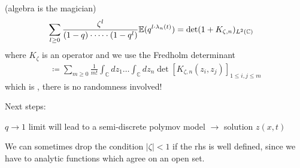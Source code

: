  (algebra is the magician)
\begin{align*}
    \sum_{l\geq 0}\frac{\zeta^l}{(1-q)\cdot\dots\cdot (1-q^l)}\mathbb{E}(q^{l\cdot \lambda_n(t)})&=\det(1+K_{\zeta,n})_{L^2(\mathbb{C})}
\end{align*}
where $K_\zeta$ is an operator and we use the Fredholm determinant
\begin{align*}
    \coloneqq \sum_{m\geq 0}\frac{1}{m!}\int_{\mathbb{C}}dz_1\dots\int_{\mathbb{C}}d z_n\det[K_{\zeta,n}(z_i,z_j)]_{1\leq i,j\leq m}
\end{align*}
which is , there is no randomness involved!

Next steps:

$q\to 1$ limit will lead to a semi-discrete polymov model $\to$ solution $z(x,t)$


\begin{aremark}
    We can sometimes drop the condition $|\zeta|<1$ if the rhs is well defined, since we have to analytic functions which agree on an open set.
\end{aremark}